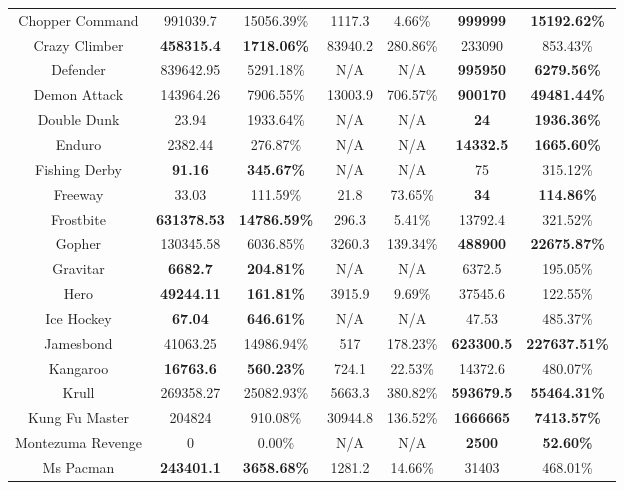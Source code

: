 \begin{table}[!hb]
\begin{center}
\begin{tabular}{c cc cc cc }
        Chopper Command & 991039.7 & 15056.39\% & 1117.3 & 4.66\% & \textbf{999999} & \textbf{15192.62\%} \\  
        Crazy Climber & \textbf{458315.4} & \textbf{1718.06\%} & 83940.2 & 280.86\% & 233090 & 853.43\% \\  
        Defender & 839642.95 & 5291.18\% & N/A & N/A & \textbf{995950} & \textbf{6279.56\%} \\  
        Demon Attack & 143964.26 & 7906.55\% & 13003.9 & 706.57\% & \textbf{900170} & \textbf{49481.44\%} \\  
        Double Dunk & 23.94 & 1933.64\% & N/A & N/A & \textbf{24} & \textbf{1936.36\%} \\  
        Enduro & 2382.44 & 276.87\% & N/A & N/A & \textbf{14332.5} & \textbf{1665.60\%} \\  
        Fishing Derby & \textbf{91.16} & \textbf{345.67\%} & N/A & N/A & 75 & 315.12\% \\  
        Freeway & 33.03 & 111.59\% & 21.8 & 73.65\% & \textbf{34} & \textbf{114.86\%} \\  
        Frostbite & \textbf{631378.53} & \textbf{14786.59\%} & 296.3 & 5.41\% & 13792.4 & 321.52\% \\  
        Gopher & 130345.58 & 6036.85\% & 3260.3 & 139.34\% & \textbf{488900} & \textbf{22675.87\%} \\  
        Gravitar & \textbf{6682.7} & \textbf{204.81\%} & N/A & N/A & 6372.5 & 195.05\% \\  
        Hero & \textbf{49244.11} & \textbf{161.81\%} & 3915.9 & 9.69\% & 37545.6 & 122.55\% \\  
        Ice Hockey & \textbf{67.04} & \textbf{646.61\%} & N/A & N/A & 47.53 & 485.37\% \\  
        Jamesbond & 41063.25 & 14986.94\% & 517 & 178.23\% & \textbf{623300.5} & \textbf{227637.51\%} \\  
        Kangaroo & \textbf{16763.6} & \textbf{560.23\%} & 724.1 & 22.53\% & 14372.6 & 480.07\% \\  
        Krull & 269358.27 & 25082.93\% & 5663.3 & 380.82\% & \textbf{593679.5} & \textbf{55464.31\%} \\  
        Kung Fu Master & 204824 & 910.08\% & 30944.8 & 136.52\% & \textbf{1666665} & \textbf{7413.57\%} \\  
        Montezuma Revenge & 0 & 0.00\% & N/A & N/A & \textbf{2500} & \textbf{52.60\%} \\  
        Ms Pacman & \textbf{243401.1} & \textbf{3658.68\%} & 1281.2 & 14.66\% & 31403 & 468.01\% \\  

\end{tabular}
\end{center}
\end{table}
